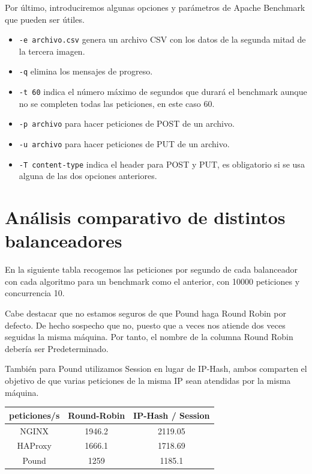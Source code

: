 \documentclass{article}
\begin{document}
Por último, introduciremos algunas opciones y parámetros de Apache Benchmark que pueden ser útiles.
\begin{itemize}
	\item \texttt{-e archivo.csv} genera un archivo CSV con los datos de la segunda mitad de la tercera imagen.
	\item \texttt{-q} elimina los mensajes de progreso.
	\item \texttt{-t 60} indica el número máximo de segundos que durará el benchmark aunque no se completen todas
	las peticiones, en este caso 60.
	\item \texttt{-p archivo} para hacer peticiones de POST de un archivo.
	\item \texttt{-u archivo} para hacer peticiones de PUT de un archivo.
	\item \texttt{-T content-type} indica el header para POST y PUT, es obligatorio si se usa alguna de las dos opciones anteriores.
\end{itemize}

\section{Análisis comparativo de distintos balanceadores}

En la siguiente tabla recogemos las peticiones por segundo de cada balanceador con cada algoritmo para un benchmark
como el anterior, con 10000 peticiones y concurrencia 10.

Cabe destacar que no estamos seguros de que Pound haga Round Robin por defecto. De hecho sospecho que no, puesto que
a veces nos atiende dos veces seguidas la misma máquina. Por tanto, el nombre de la columna Round Robin debería ser
Predeterminado.

También para Pound utilizamos Session en lugar de IP-Hash,
ambos comparten el objetivo de que varias peticiones de la misma IP sean atendidas por la misma máquina.

\begin{table}[H]
	\centering
	\begin{tabular}{|c|c|c|}
		\hline
		\multicolumn{1}{|l|}{peticiones/s} & \multicolumn{1}{l|}{Round-Robin} & \multicolumn{1}{l|}{IP-Hash / Session} \\ \hline
		NGINX                              & 1946.2                           & 2119.05                                \\ \hline
		HAProxy                            & 1666.1                           & 1718.69                                \\ \hline
		Pound                              & 1259                             & 1185.1                                 \\ \hline
	\end{tabular}
\end{table}
\end{document}
